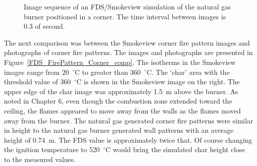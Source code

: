 \documentclass[twoside]{uocthesis}
\begin{document}
{\begin{figure}[p]
	\caption[Image sequence of an FDS/Smokeview simulation of the natural gas burner positioned in a corner.]{Image sequence of an FDS/Smokeview simulation of the natural gas burner positioned in a corner. The time interval between images is 0.3 of second.}
	\label{FDS_Corner_Sequence}
\end{figure}
The next comparison was between the Smokeview corner fire pattern images and photographs of corner fire patterns.  The images and photographs are presented in Figure~\ref{FDS_FirePattern_Corner_comp}.  The isotherms in the Smokeview images range from 20~$^\circ$C to greater than 360~$^\circ$C.  The `char' area with the threshold value of 360~$^\circ$C is shown in the Smokeview image on the right.  The upper edge of the char image was approximately 1.5~m above the burner.  As noted in Chapter 6, even though the combustion zone extended toward the ceiling, the flames appeared to move away from the walls as the flames moved away from the burner.  The natural gas generated corner fire patterns were similar in height to the natural gas burner generated wall patterns with an average height of 0.74~m.  The FDS value is approximately twice that.  Of course changing the ignition temperature to 520~$^\circ$C would bring the simulated char height close to the measured values.

}
\end{document}
